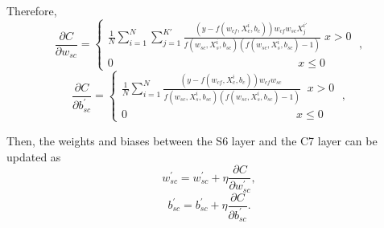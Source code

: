 \documentclass{sig-alternate-05-2015}
\begin{document}
Therefore,
\begin{equation}\label{}
\frac{{\partial C}}{{\partial {w_{sc}}}} = \left\{ \begin{array}{l}
\frac{1}{N}\sum\limits_{i = 1}^N {\sum\limits_{j = 1}^{K'} {\frac{{\left( {y - f({w_{cf}},X_c^i,{b_c})} \right){w_{cf}}{w_{sc}}X_j^{i'}\;}}{{f({w_{sc}},X_s^i,{b_{sc}})\left( {f({w_{sc}},X_s^i,{b_{sc}}) - 1} \right)}}} } \;x > 0\;\\
0\;\;\;\;\;\;\;\;\;\;\;\;\;\;\;\;\;\;\;\;\;\;\;\;\;\;\;\;\;\;\;\;\;\;\;\;\;\;\;\;\;\;\;\;\;\;\;\;\;\;\;\;\;\;\;\;\;\;\;x \le 0
\end{array} \right.,
\end{equation}
\begin{equation}\label{}
\frac{{\partial C}}{{\partial b_{sc}^{'}}} = \left\{ \begin{array}{l}
\frac{1}{N}\sum\limits_{i = 1}^N {\frac{{\left( {y - f({w_{cf}},X_c^i,{b_c})} \right){w_{cf}}{w_{sc}}\;}}{{f({w_{sc}},X_s^i,{b_{sc}})\left( {f({w_{sc}},X_s^i,{b_{sc}}) - 1} \right)}}} \;\;x > 0\;\\
0\;\;\;\;\;\;\;\;\;\;\;\;\;\;\;\;\;\;\;\;\;\;\;\;\;\;\;\;\;\;\;\;\;\;\;\;\;\;\;\;\;\;\;\;\;\;\;\;\;\;\;\;\;\;x \le 0
\end{array} \right.,
\end{equation}

Then, the weights and biases between the S6 layer and the C7 layer can be updated as
\begin{equation}\label{}
{w_{sc}^{'}} = {w_{sc}^{'}} + \eta \frac{{\partial C}}{{\partial {w_{sc}^{'}}}},
\end{equation}
\begin{equation}\label{}
{b_{sc}^{'}} = {b_{sc}^{'}} + \eta \frac{{\partial C}}{{\partial {b_{sc}^{'}}}}.
\end{equation}
\end{document}
